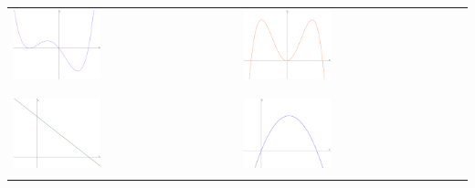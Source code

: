 \documentclass[oneside,openany,headings=optiontotoc,11pt,numbers=noenddot]{scrreprt}
\begin{document}
	\begin{tabularx}{\textwidth}{M|M}
		\includegraphics[width=0.4\textwidth,align=c]{../99_Bilder/2VKA/Vl.png} & \includegraphics[width=0.4\textwidth,align=c]{../99_Bilder/2VKA/Vk.png}\\
		& \\
		\hline
		& \\
		\includegraphics[width=0.4\textwidth,align=c]{../99_Bilder/2VKA/Vf.png} & \includegraphics[width=0.4\textwidth,align=c]{../99_Bilder/2VKA/Vh.png}\\
		\\
	\end{tabularx}
\end{document}

